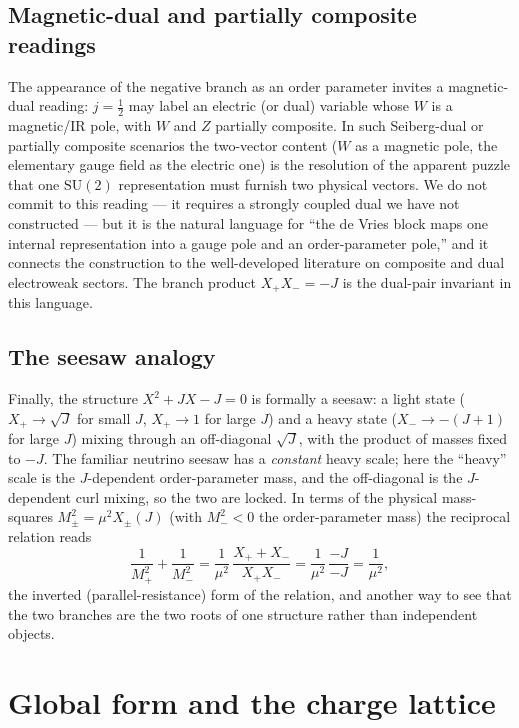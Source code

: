 \documentclass[11pt]{article}
\theoremstyle{plain}
\theoremstyle{definition}
\newcommand{\Xp}{X_{+}}
\newcommand{\Xm}{X_{-}}
\newcommand{\half}{\tfrac12}
\newcommand{\SU}{\mathrm{SU}}
\begin{document}
\subsection{Magnetic-dual and partially composite readings}

The appearance of the negative branch as an order parameter invites a
magnetic-dual reading: $j=\half$ may label an electric (or dual) variable
whose $W$ is a magnetic/IR pole, with $W$ and $Z$ partially composite. In
such Seiberg-dual or partially composite scenarios the two-vector content
($W$ as a magnetic pole, the elementary gauge field as the electric one) is
the resolution of the apparent puzzle that one $\SU(2)$ representation must
furnish two physical vectors. We do not commit to this reading --- it
requires a strongly coupled dual we have not constructed --- but it is the
natural language for ``the de Vries block maps one internal representation
into a gauge pole and an order-parameter pole,'' and it connects the
construction to the well-developed literature on composite and dual
electroweak sectors. The branch product $\Xp\Xm=-J$ is the dual-pair
invariant in this language.

\subsection{The seesaw analogy}

Finally, the structure $X^2+JX-J=0$ is formally a seesaw: a light state
($\Xp\to\sqrt J$ for small $J$, $\Xp\to1$ for large $J$) and a heavy state
($\Xm\to-(J+1)$ for large $J$) mixing through an off-diagonal $\sqrt J$, with
the product of masses fixed to $-J$. The familiar neutrino seesaw has a
\emph{constant} heavy scale; here the ``heavy'' scale is the
$J$-dependent order-parameter mass, and the off-diagonal is the
$J$-dependent curl mixing, so the two are locked. In terms of the physical
mass-squares $M_\pm^2=\mu^2 X_\pm(J)$ (with $M_-^2<0$ the order-parameter
mass) the reciprocal relation reads
\begin{equation}
\frac1{M_+^2}+\frac1{M_-^2}
=\frac1{\mu^2}\,\frac{X_+ + X_-}{X_+ X_-}
=\frac1{\mu^2}\,\frac{-J}{-J}=\frac1{\mu^2},
\end{equation}
the inverted (parallel-resistance) form of the relation, and another way to
see that the two branches are the two roots of one structure rather than
independent objects.

\section{Global form and the charge lattice}
\label{sec:globalform}
\end{document}
